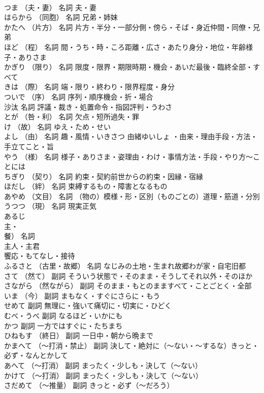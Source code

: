 \documentclass[8pt]{extreport}
\begin{document}
\begin{CJK}{UTF8}{min}
\\	つま	（夫・妻）	名詞	夫・妻
\\	はらから	（同胞）	名詞	兄弟・姉妹
\\	かたへ	（片方）	名詞	片方・半分・一部分側・傍ら・そば・身近仲間・同僚・兄弟
\\	ほど	（程）	名詞	間・うち・時・ころ距離・広さ・あたり身分・地位・年齢様子・ありさま
\\	かぎり	（限り）	名詞	限度・限界・期限時期・機会・あいだ最後・臨終全部・すべて
\\	きは	（際）	名詞	端・限り・終わり・限界程度・身分
\\	ついで	（序）	名詞	序列・順序機会・折・場合
\\	沙汰		名詞	評議・裁き・処置命令・指図評判・うわさ
\\	とが	（咎・利）	名詞	欠点・短所過失・罪
\\	け	（故）	名詞	ゆえ・ため・せい
\\	よし	（由）	名詞	趣・風情・いきさつ 由緒ゆいしょ ・由来・理由手段・方法・手立てこと・旨
\\	やう	（様）	名詞	様子・ありさま・姿理由・わけ・事情方法・手段・やり方～ことには
\\	ちぎり	（契り）	名詞	約束・契約前世からの約束・因縁・宿縁
\\	ほだし	（絆）	名詞	束縛するもの・障害となるもの
\\	あやめ	（文目）	名詞	（物の）模様・形・区別（ものごとの）道理・筋道・分別
\\	うつつ	（現）	名詞	現実正気
\\	あるじ	
\\	主・
\\	餐）	名詞	
\\	主人・主君
\\	饗応・もてなし・接待
\\	ふるさと	（古里・故郷）	名詞	なじみの土地・生まれ故郷わが家・自宅旧都
\\	さて	（然て）	副詞	そういう状態で・そのまま・そうしてそれ以外・そのほか
\\	さながら	（然ながら）	副詞	そのまま・もとのまますべて・ことごとく・全部
\\	いま	（今）	副詞	まもなく・すぐにさらに・もう
\\	せめて		副詞	無理に・強いて痛切に・切実に・ひどく
\\	むべ・うべ		副詞	なるほど・いかにも
\\	かつ		副詞	一方ではすぐに・たちまち
\\	ひねもす	（終日）	副詞	一日中・朝から晩まで
\\	かまへて	（～打消・禁止）	副詞	決して・絶対に（～ない・～するな）きっと・必ず・なんとかして
\\	あへて	（～打消）	副詞	まったく・少しも・決して（～ない）
\\	かけて	（～打消）	副詞	まったく・少しも・決して（～ない）
\\	さだめて	（～推量）	副詞	きっと・必ず（～だろう）
\end{CJK}
\end{document}
